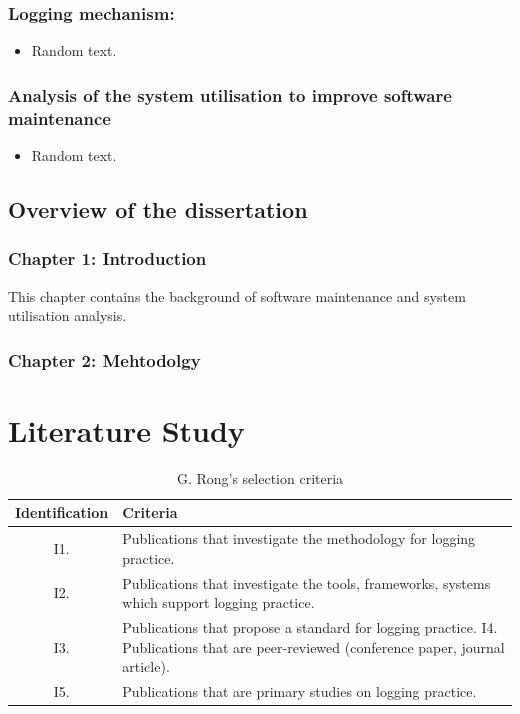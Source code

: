 \subsubsection{Logging mechanism:}
\begin{itemize}
    \item Random text.
\end{itemize}

\subsubsection{Analysis of the system utilisation to improve software maintenance}
\begin{itemize}
    \item Random text.
\end{itemize}

\subsection{Overview of the dissertation}
\subsubsection{Chapter 1: Introduction}
This chapter contains the background of software maintenance and system
utilisation analysis.
\subsubsection{Chapter 2: Mehtodolgy}

\newpage
\section{Literature Study}

\begin{table}[!htb]
    \centering
    \small
    \caption{G. Rong's selection criteria \cite{Rong2018a}}
    \label{tbl:CH1_RongIncSelectionCriteria}
    \begin{tabularx}{\textwidth}{|c|X|}
        \hline \textbf{Identification} & \textbf{Criteria} \\
        \hline I1. & Publications that investigate the methodology for logging practice. \\
        \hline I2. & Publications that investigate the tools, frameworks, systems which support logging practice. \\
        \hline I3. & Publications that propose a standard for logging practice. I4. Publications that are peer-reviewed (conference paper, journal article). \\
        \hline I5. & Publications that are primary studies on logging practice. \\
        \hline
    \end{tabularx}
\end{table}

